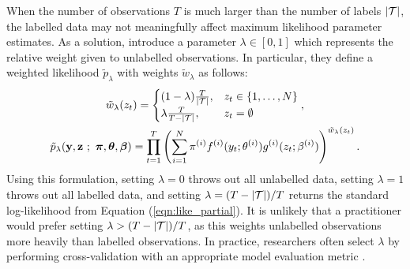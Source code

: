 When the number of observations $T$ is much larger than the number of labels $|\mathcal{T}|$, the labelled data may not meaningfully affect maximum likelihood parameter estimates. As a solution, \citet{Chapelle:2006} introduce a parameter $\lambda \in [0,1]$ which represents the relative weight given to unlabelled observations. In particular, they define a weighted likelihood $\tilde p_\lambda$ with weights $\tilde w_\lambda$ as follows:
%
\begin{gather}
    \tilde w_\lambda(z_t) = \begin{cases}
    (1-\lambda) \frac{T}{|\mathcal{T}|}, & z_t \in \{1,\ldots,N\} \\ 
    \lambda \frac{T}{T-|\mathcal{T}|}, & z_t = \emptyset \\
    \end{cases}, \label{eqn:tilde_w_lambda} \\
    \tilde p_\lambda (\mathbf{y},\mathbf{z} ~;~ \boldsymbol{\pi},\boldsymbol{\theta},\boldsymbol{\beta}) = \prod_{t = 1}^T \left(\sum_{i = 1}^N \pi^{(i)} f^{(i)}(y_t; \theta^{(i)}) g^{(i)}(z_t ; \beta^{(i)}) \right)^{\tilde w_\lambda(z_t)}.
    \label{eqn:like_partial_lambda} 
\end{gather}
%
Using this formulation, setting $\lambda = 0$ throws out all unlabelled data, setting $\lambda = 1$ throws out all labelled data, and setting $\lambda = (T-|\mathcal{T}|)/T$ returns the standard log-likelihood from Equation (\ref{eqn:like_partial}). It is unlikely that a practitioner would prefer setting $\lambda > (T-|\mathcal{T}|)/T$, as this weights unlabelled observations more heavily than labelled observations. In practice, researchers often select $\lambda$ by performing cross-validation with an appropriate model evaluation metric \citep{Chapelle:2006}. 